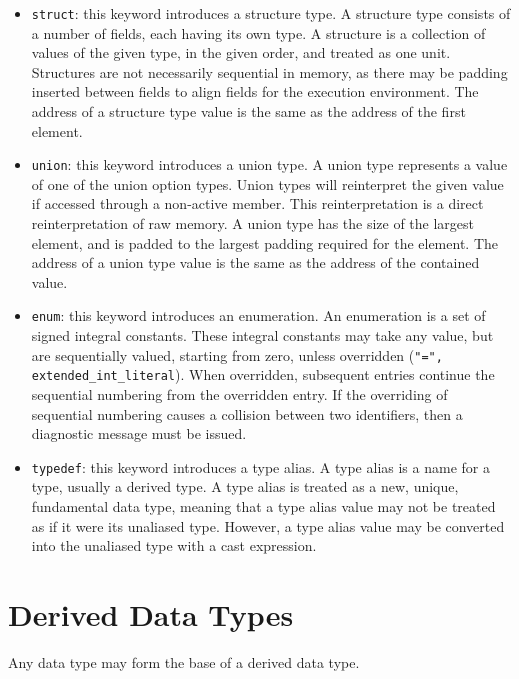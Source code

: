 \documentclass[letterpaper,12pt]{book}
\begin{document}
\begin{itemize}
	\item \texttt{struct}: this keyword introduces a structure type. A structure type consists of a number of fields, each having its own type. A structure is a collection of values of the given type, in the given order, and treated as one unit. Structures are not necessarily sequential in memory, as there may be padding inserted between fields to align fields for the execution environment. The address of a structure type value is the same as the address of the first element.
	
	\item \texttt{union}: this keyword introduces a union type. A union type represents a value of one of the union option types. Union types will reinterpret the given value if accessed through a non-active member. This reinterpretation is a direct reinterpretation of raw memory. A union type has the size of the largest element, and is padded to the largest padding required for the element. The address of a union type value is the same as the address of the contained value.
	
	\item \texttt{enum}: this keyword introduces an enumeration. An enumeration is a set of signed integral constants. These integral constants may take any value, but are sequentially valued, starting from zero, unless overridden (\texttt{"=", extended\_int\_literal}). When overridden, subsequent entries continue the sequential numbering from the overridden entry. If the overriding of sequential numbering causes a collision between two identifiers, then a diagnostic message must be issued.
	
	\item \texttt{typedef}: this keyword introduces a type alias. A type alias is a name for a type, usually a derived type. A type alias is treated as a new, unique, fundamental data type, meaning that a type alias value may not be treated as if it were its unaliased type. However, a type alias value may be converted into the unaliased type with a cast expression.
\end{itemize}

\section{Derived Data Types}

Any data type may form the base of a derived data type.
\end{document}
